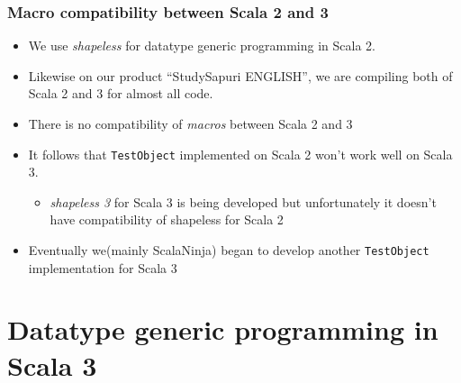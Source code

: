 \begin{frame}
  \frametitle{Macro compatibility between Scala 2 and 3}

  \begin{itemize}
    \item We use \emph{shapeless}\cite{shapeless_github} for datatype generic programming in Scala 2.

    \item Likewise on our product ``StudySapuri ENGLISH'', 
    we are compiling both of Scala 2 and 3 for almost all code.

    \item There is no compatibility of \emph{macros} between Scala 2 and 3 

    \item It follows that \lstinline|TestObject| implemented on Scala 2 won't work well on Scala 3.
    \begin{itemize}
      \item \emph{shapeless 3}\cite{shapeless-3_github} for Scala 3 is being developed but unfortunately
      it doesn't have compatibility of shapeless for Scala 2
    \end{itemize}

    \item Eventually we(mainly ScalaNinja) began to develop another \lstinline|TestObject| implementation for Scala 3
  \end{itemize}
\end{frame}

\section{Datatype generic programming in Scala 3}

